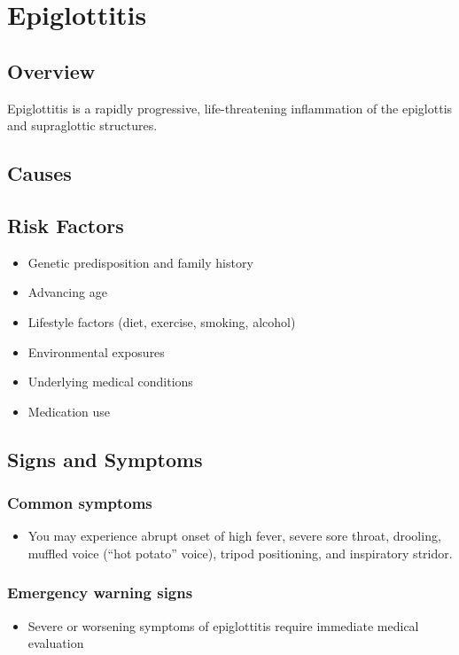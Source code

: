 \chapter{Epiglottitis}
\label{sec:Epiglottitis}

\section{Overview}
Epiglottitis is a rapidly progressive, life-threatening inflammation of the epiglottis and supraglottic structures.
\section{Causes}
\section{Risk Factors}

\begin{itemize}[noitemsep]
  \item Genetic predisposition and family history
  \item Advancing age
  \item Lifestyle factors (diet, exercise, smoking, alcohol)
  \item Environmental exposures
  \item Underlying medical conditions
  \item Medication use
\end{itemize}
\section{Signs and Symptoms}

\subsection{Common symptoms}
\begin{itemize}[noitemsep]
  \item You may experience abrupt onset of high fever, severe sore throat, drooling, muffled voice (``hot potato'' voice), tripod positioning, and inspiratory stridor. 
  \end{itemize}

\subsection{Emergency warning signs}
\begin{itemize}[noitemsep]
  \item Severe or worsening symptoms of epiglottitis require immediate medical evaluation
\end{itemize}
